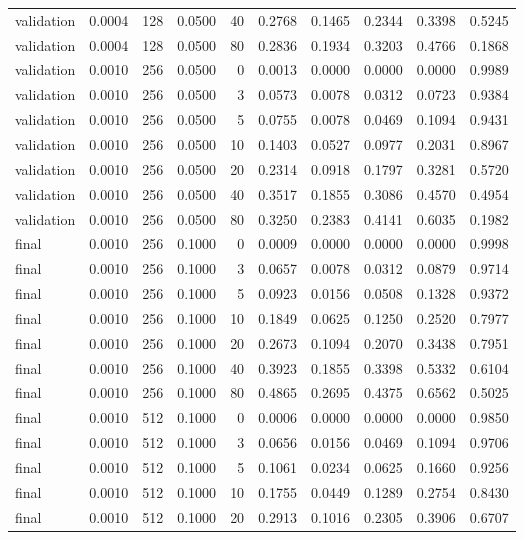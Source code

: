 \begin{tabular}{lrrrrrrrrr}
validation & 0.0004 & 128 & 0.0500 & 40 & 0.2768 & 0.1465 & 0.2344 & 0.3398 & 0.5245 \\
validation & 0.0004 & 128 & 0.0500 & 80 & 0.2836 & 0.1934 & 0.3203 & 0.4766 & 0.1868 \\
validation & 0.0010 & 256 & 0.0500 & 0 & 0.0013 & 0.0000 & 0.0000 & 0.0000 & 0.9989 \\
validation & 0.0010 & 256 & 0.0500 & 3 & 0.0573 & 0.0078 & 0.0312 & 0.0723 & 0.9384 \\
validation & 0.0010 & 256 & 0.0500 & 5 & 0.0755 & 0.0078 & 0.0469 & 0.1094 & 0.9431 \\
validation & 0.0010 & 256 & 0.0500 & 10 & 0.1403 & 0.0527 & 0.0977 & 0.2031 & 0.8967 \\
validation & 0.0010 & 256 & 0.0500 & 20 & 0.2314 & 0.0918 & 0.1797 & 0.3281 & 0.5720 \\
validation & 0.0010 & 256 & 0.0500 & 40 & 0.3517 & 0.1855 & 0.3086 & 0.4570 & 0.4954 \\
validation & 0.0010 & 256 & 0.0500 & 80 & 0.3250 & 0.2383 & 0.4141 & 0.6035 & 0.1982 \\
final & 0.0010 & 256 & 0.1000 & 0 & 0.0009 & 0.0000 & 0.0000 & 0.0000 & 0.9998 \\
final & 0.0010 & 256 & 0.1000 & 3 & 0.0657 & 0.0078 & 0.0312 & 0.0879 & 0.9714 \\
final & 0.0010 & 256 & 0.1000 & 5 & 0.0923 & 0.0156 & 0.0508 & 0.1328 & 0.9372 \\
final & 0.0010 & 256 & 0.1000 & 10 & 0.1849 & 0.0625 & 0.1250 & 0.2520 & 0.7977 \\
final & 0.0010 & 256 & 0.1000 & 20 & 0.2673 & 0.1094 & 0.2070 & 0.3438 & 0.7951 \\
final & 0.0010 & 256 & 0.1000 & 40 & 0.3923 & 0.1855 & 0.3398 & 0.5332 & 0.6104 \\
final & 0.0010 & 256 & 0.1000 & 80 & 0.4865 & 0.2695 & 0.4375 & 0.6562 & 0.5025 \\
final & 0.0010 & 512 & 0.1000 & 0 & 0.0006 & 0.0000 & 0.0000 & 0.0000 & 0.9850 \\
final & 0.0010 & 512 & 0.1000 & 3 & 0.0656 & 0.0156 & 0.0469 & 0.1094 & 0.9706 \\
final & 0.0010 & 512 & 0.1000 & 5 & 0.1061 & 0.0234 & 0.0625 & 0.1660 & 0.9256 \\
final & 0.0010 & 512 & 0.1000 & 10 & 0.1755 & 0.0449 & 0.1289 & 0.2754 & 0.8430 \\
final & 0.0010 & 512 & 0.1000 & 20 & 0.2913 & 0.1016 & 0.2305 & 0.3906 & 0.6707 \\

\end{tabular}
